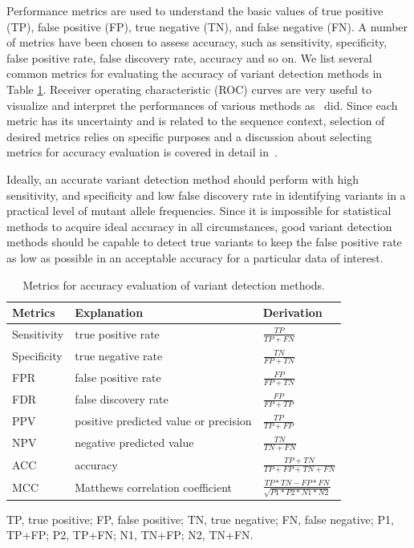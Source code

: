 \documentclass[a4,center,fleqn]{NAR}
\begin{document}
Performance metrics are used to understand the basic values of true positive (TP), false positive (FP), true negative (TN), and false negative (FN).
A number of metrics have been chosen to assess accuracy, such as sensitivity, specificity, false positive rate, false discovery rate, accuracy and so on.
We list several common metrics for evaluating the accuracy of variant detection methods in Table \ref{tbl:metrics}.
Receiver operating characteristic (ROC) curves are very useful to visualize and interpret the performances of various methods as~\citep{Xu2014, Huang2015, He2015} did.
Since each metric has its uncertainty and is related to the sequence context, selection of desired metrics relies on specific purposes and a discussion about selecting metrics for accuracy evaluation is covered in detail in~\citep{Olson2015}.

Ideally, an accurate variant detection method should perform with high sensitivity, and specificity and low false discovery rate in identifying variants in a practical level of mutant allele frequencies.
Since it is impossible for statistical methods to acquire ideal accuracy in all circumstances, good variant detection methods should be capable to detect true variants to keep the false positive rate as low as possible in an acceptable accuracy for a particular data of interest.


\begin{table}[htp]
  \centering
  \footnotesize 
  \caption{Metrics for accuracy evaluation of variant detection methods.}\label{tbl:metrics}
  \begin{threeparttable}    
  \begin{tabular}{lll}
    \textbf{Metrics} & \textbf{Explanation} & \textbf{Derivation} \\
    \toprule    
    Sensitivity & true positive rate & $\frac{TP}{TP+FN}$ \\[0.2cm]
    Specificity & true negative rate & $\frac{TN}{FP+TN}$ \\[0.2cm]
    FPR   & false positive rate & $\frac{FP}{FP+TN}$ \\[0.2cm]
    FDR   & false discovery rate &  $\frac{FP}{FP+TP}$ \\[0.2cm]
    PPV   & positive predicted value or precision & $\frac{TP}{TP+FP}$ \\[0.2cm]
    NPV   & negative predicted value & $\frac{TN}{TN+FN}$ \\[0.2cm]
    ACC   & accuracy & $\frac{TP+TN}{TP+FP+TN+FN}$ \\[0.2cm]
    MCC   & Matthews correlation coefficient & $\frac{TP*TN-FP*FN}{\sqrt{P1*P2*N1*N2}}$ \\
    \bottomrule
    \end{tabular}%
    \begin{tablenotes}
	\item TP, true positive; FP, false positive; TN, true negative; FN, false negative;  
                 P1, TP+FP; P2, TP+FN; N1, TN+FP; N2, TN+FN.
    \end{tablenotes}
\end{threeparttable}
\end{table}
\end{document}
